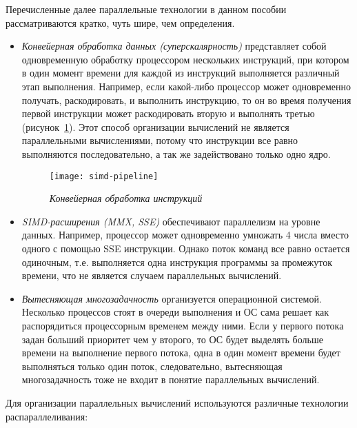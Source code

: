Перечисленные далее параллельные технологии в данном пособии рассматриваются кратко, чуть шире, чем определения.

\begin{itemize}
    \sloppy
    \item\textit{Конвейерная обработка данных (суперскалярность)} представляет собой одновременную обработку процессором нескольких инструкций, при котором в один момент времени для каждой из инструкций выполняется различный этап выполнения. Например, если какой-либо процессор может одновременно получать, раскодировать, и выполнить инструкцию, то он во время получения первой инструкции может раскодировать вторую и выполнять третью (рисунок~\ref{pipelineExample:image}). Этот способ организации вычислений не является параллельными вычислениями, потому что инструкции все равно выполняются последовательно, а так же задействовано только одно ядро.
    
    \begin{figure}[H]
         \texttt{[image: simd-pipeline]}
         \caption{\textit{Конвейерная обработка инструкций}}
         \label{pipelineExample:image}
    \end{figure}
    \item\textit{SIMD-расширения (MMX, SSE)} обеспечивают параллелизм на уровне данных. Например, процессор может одновременно умножать 4 числа вместо одного с помощью SSE инструкции. Однако поток команд все равно остается одиночным, т.е. выполняется одна инструкция программы за промежуток времени, что не является случаем параллельных вычислений.
    \item\textit{Вытесняющая многозадачность} организуется операционной системой. Несколько процессов стоят в очереди выполнения и ОС сама решает как распорядиться процессорным временем между ними. Если у первого потока задан больший приоритет чем у второго, то ОС будет выделять больше времени на выполнение первого потока, одна в один момент времени будет выполняться только один поток, следовательно, вытесняющая многозадачность тоже не входит в понятие параллельных вычислений.
\end{itemize}

Для организации параллельных вычислений используются различные технологии распараллеливания:

